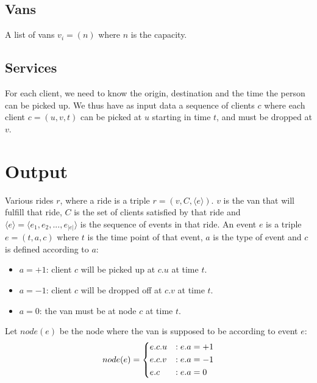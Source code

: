 \subsection{Vans} \label{problem-formalization-input-vans}
A list of vans $v_i=(n)$ where $n$ is the capacity.
\subsection{Services} \label{problem-formalization-input-services}
For each client, we need to know the origin, destination and the time the person can be picked up.
We thus have as input data a sequence of clients $c$ where each client $c=(u, v, t)$ can be picked at $u$ starting in time $t$, and must be dropped at $v$.
\section{Output} \label{problem-formalization-output}
Various rides $r$, where a ride is a triple $r=(v, C, \langle e \rangle)$. $v$ is the van that will fulfill that ride, $C$ is the set of clients satisfied by that ride and $\langle e \rangle = \langle e_1, e_2,...,e_{|e|} \rangle$ is the sequence of events in that ride. An event $e$ is a triple $e=(t, a, c)$ where $t$ is the time point of that event, $a$ is the type of event and $c$ is defined according to $a$:
\begin{itemize}
    \item $a=+1$: client $c$ will be picked up at $c.u$ at time $t$.
    \item $a=-1$: client $c$ will be dropped off at $c.v$ at time $t$.
    \item $a=0$: the van must be at node $c$ at time $t$.
\end{itemize}
Let $node(e)$ be the node where the van is supposed to be according to event $e$:
\begin{equation*}
    node(e)=\begin{dcases}
        e.c.u & : e.a = +1\\
        e.c.v & : e.a = -1\\
        e.c   & : e.a = 0
    \end{dcases}
\end{equation*}
